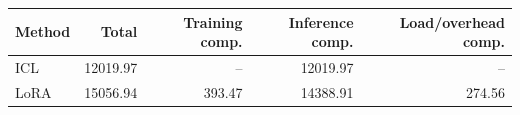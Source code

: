 \begin{tabular}{lrrrr}
\toprule
Method & Total & Training comp. & Inference comp. & Load/overhead comp. \\
\midrule
ICL & 12019.97 & -- & 12019.97 & -- \\
LoRA & 15056.94 & 393.47 & 14388.91 & 274.56 \\
\bottomrule
\end{tabular}
